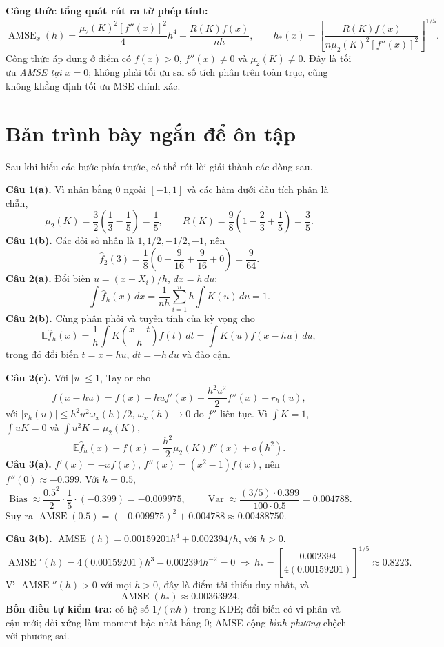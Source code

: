 \documentclass[11pt,a4paper]{article}
\newcommand{\E}{\mathbb E}
\newcommand{\fh}{\widehat f_h}
\DeclareMathOperator{\Var}{Var}
\DeclareMathOperator{\Bias}{Bias}
\DeclareMathOperator{\AMSE}{AMSE}
\begin{document}
\textbf{Công thức tổng quát rút ra từ phép tính:}
\[
\AMSE_x(h)=\frac{\mu_2(K)^2[f''(x)]^2}{4}h^4+\frac{R(K)f(x)}{nh},
\qquad
h_*(x)=\left[\frac{R(K)f(x)}{n\mu_2(K)^2[f''(x)]^2}\right]^{1/5}.
\]
Công thức áp dụng ở điểm có $f(x)>0$, $f''(x)\ne0$ và $\mu_2(K)\ne0$. Đây là tối ưu \emph{AMSE tại $x=0$}; không phải tối ưu sai số tích phân trên toàn trục, cũng không khẳng định tối ưu MSE chính xác.

\clearpage
\section*{Bản trình bày ngắn để ôn tập}
Sau khi hiểu các bước phía trước, có thể rút lời giải thành các dòng sau.

\textbf{Câu 1(a).} Vì nhân bằng 0 ngoài $[-1,1]$ và các hàm dưới dấu tích phân là chẵn,
\[
\mu_2(K)=\frac32\left(\frac13-\frac15\right)=\frac15,
\qquad R(K)=\frac98\left(1-\frac23+\frac15\right)=\frac35.
\]
\textbf{Câu 1(b).} Các đối số nhân là $1,1/2,-1/2,-1$, nên
\[
\widehat f_2(3)=\frac18\left(0+\frac9{16}+\frac9{16}+0\right)=\frac9{64}.
\]
\textbf{Câu 2(a).} Đổi biến $u=(x-X_i)/h$, $dx=h\,du$:
\[
\int\fh(x)\,dx=\frac1{nh}\sum_{i=1}^nh\int K(u)\,du=1.
\]
\textbf{Câu 2(b).} Cùng phân phối và tuyến tính của kỳ vọng cho
\[
\E\fh(x)=\frac1h\int K\!\left(\frac{x-t}{h}\right)f(t)\,dt
=\int K(u)f(x-hu)\,du,
\]
trong đó đổi biến $t=x-hu$, $dt=-h\,du$ và đảo cận.

\textbf{Câu 2(c).} Với $|u|\leq1$, Taylor cho
\[
f(x-hu)=f(x)-hu f'(x)+\frac{h^2u^2}{2}f''(x)+r_h(u),
\]
với $|r_h(u)|\leq h^2u^2\omega_x(h)/2$, $\omega_x(h)\to0$ do $f''$ liên tục. Vì $\int K=1$, $\int uK=0$ và $\int u^2K=\mu_2(K)$,
\[
\E\fh(x)-f(x)=\frac{h^2}{2}\mu_2(K)f''(x)+o(h^2).
\]
\textbf{Câu 3(a).} $f'(x)=-xf(x)$, $f''(x)=(x^2-1)f(x)$, nên $f''(0)\approx-0.399$. Với $h=0.5$,
\[
\Bias\approx\frac{0.5^2}{2}\cdot\frac15\cdot(-0.399)=-0.009975,
\qquad \Var\approx\frac{(3/5)\cdot0.399}{100\cdot0.5}=0.004788.
\]
Suy ra $\AMSE(0.5)=(-0.009975)^2+0.004788\approx0.00488750$.

\textbf{Câu 3(b).} $\AMSE(h)=0.00159201h^4+0.002394/h$, với $h>0$.
\[
\AMSE'(h)=4(0.00159201)h^3-0.002394h^{-2}=0
\ \Longrightarrow\ 
h_* =\left[\frac{0.002394}{4(0.00159201)}\right]^{1/5}\approx0.8223.
\]
Vì $\AMSE''(h)>0$ với mọi $h>0$, đây là điểm tối thiểu duy nhất, và
\[
\boxed{\AMSE(h_*)\approx0.00363924.}
\]
\vfill
\textbf{Bốn điều tự kiểm tra:} có hệ số $1/(nh)$ trong KDE; đổi biến có vi phân và cận mới; đối xứng làm moment bậc nhất bằng 0; AMSE cộng \emph{bình phương} chệch với phương sai.
\end{document}
